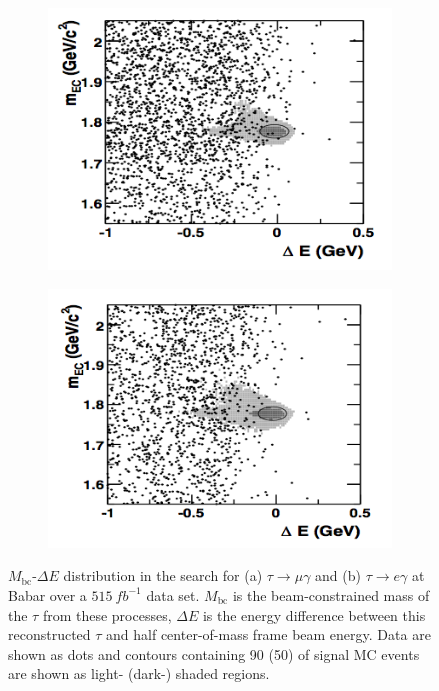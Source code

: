 \documentclass[12pt]{thesis}  %
\begin{document}
   \begin{figure}[h]
        \centering
        \begin{subfigure}[b]{0.475\textwidth}
            \centering
            \includegraphics[width=\textwidth]{images/babar-search-tauMG-signal-region.png}
            \caption[Network2]%
            {{\small}}    
            \label{fig:mean and std of net14}
        \end{subfigure}
        \hfill
        \begin{subfigure}[b]{0.475\textwidth}  
            \centering 
            \includegraphics[width=\textwidth]{images/babar-search-tauEG-signal-region.png}
            \caption[]%
            {{\small}}    
            \label{fig:mean and std of net24}
        \end{subfigure}
        \caption{$M_{\text{bc}}$-$\Delta E$ distribution in the search for (a) $\tau\to\mu\gamma$ and (b) $\tau\to e\gamma$ at Babar over a $\SI{515}{fb^{-1}}$ data set. $M_{\text{bc}}$ is the beam-constrained mass of the $\tau$ from these processes, $\Delta E$ is the energy difference between this reconstructed $\tau$ and half center-of-mass frame beam energy. Data are shown as dots and contours containing \num{90}{\percent} (\num{50}{\percent}) of signal MC events are shown as light- (dark-) shaded regions.}
    \end{figure}
\end{document}

